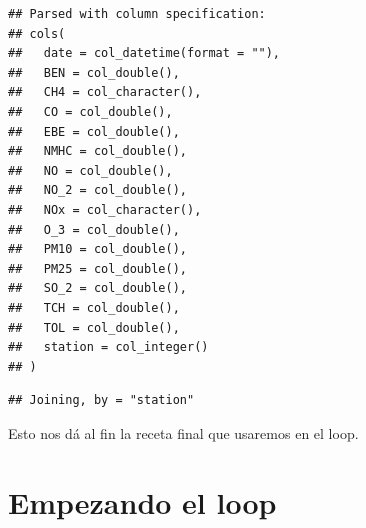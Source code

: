 \documentclass[]{book}
\newenvironment{Shaded}{\begin{snugshade}}{\end{snugshade}}
\newcommand{\DataTypeTok}[1]{\textcolor[rgb]{0.13,0.29,0.53}{#1}}
\newcommand{\DecValTok}[1]{\textcolor[rgb]{0.00,0.00,0.81}{#1}}
\newcommand{\KeywordTok}[1]{\textcolor[rgb]{0.13,0.29,0.53}{\textbf{#1}}}
\newcommand{\NormalTok}[1]{#1}
\newcommand{\OperatorTok}[1]{\textcolor[rgb]{0.81,0.36,0.00}{\textbf{#1}}}
\newcommand{\OtherTok}[1]{\textcolor[rgb]{0.56,0.35,0.01}{#1}}
\newcommand{\StringTok}[1]{\textcolor[rgb]{0.31,0.60,0.02}{#1}}
\begin{document}
\begin{Shaded}
\end{Shaded}

\begin{verbatim}
## Parsed with column specification:
## cols(
##   date = col_datetime(format = ""),
##   BEN = col_double(),
##   CH4 = col_character(),
##   CO = col_double(),
##   EBE = col_double(),
##   NMHC = col_double(),
##   NO = col_double(),
##   NO_2 = col_double(),
##   NOx = col_character(),
##   O_3 = col_double(),
##   PM10 = col_double(),
##   PM25 = col_double(),
##   SO_2 = col_double(),
##   TCH = col_double(),
##   TOL = col_double(),
##   station = col_integer()
## )
\end{verbatim}

\begin{verbatim}
## Joining, by = "station"
\end{verbatim}

Esto nos dá al fin la receta final que usaremos en el loop.

\hypertarget{empezando-el-loop}{%
\section{Empezando el loop}\label{empezando-el-loop}}
\end{document}
